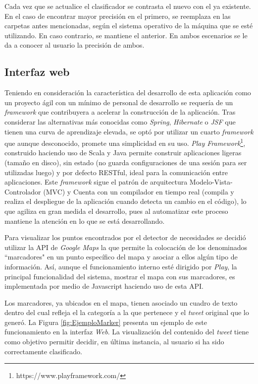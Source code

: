 Cada vez que se actualice el clasificador se contrasta el nuevo con el ya existente. En el caso de encontrar mayor precisión en el primero, se reemplaza en las carpetas antes mencionadas, según el sistema operativo de la máquina que se esté utilizando. En caso contrario, se mantiene el anterior. En ambos escenarios se le da a conocer al usuario la precisión de ambos.

\subsection{Interfaz web}
\label{sec:diseno:interfaz}

Teniendo en consideración la característica del desarrollo de esta aplicación como un proyecto ágil con un mínimo de personal de desarrollo se requería de un \textit{framework} que contribuyera a acelerar la construcción de la aplicación. Tras considerar las alternativas más conocidas como \textit{Spring}, \textit{Hibernate} o \textit{JSF} que tienen una curva de aprendizaje elevada, se optó por utilizar un cuarto \textit{framework} que aunque desconocido, promete una simplicidad en su uso. \textit{Play Framework}\footnote{https://www.playframework.com/}, construido haciendo uso de Scala y Java permite construir aplicaciones ligeras (tamaño en disco), sin estado (no guarda configuraciones de una sesión para ser utilizadas luego) y por defecto RESTful, ideal para la comunicación entre aplicaciones. Este \textit{framework} sigue el patrón de arquitectura Modelo-Vista-Controlador (MVC) y Cuenta con un compilador en tiempo real (compila y realiza el despliegue de la aplicación cuando detecta un cambio en el código), lo que agiliza en gran medida el desarrollo, pues al automatizar este proceso mantiene la atención en lo que se está desarrollando.

Para visualizar los puntos encontrados por el detector de necesidades se decidió utilizar la API de \textit{Google Maps} la que permite la colocación de los denominados ``marcadores" en un punto específico del mapa y asociar a ellos algún tipo de información. Así, aunque el funcionamiento interno esté dirigido por \textit{Play}, la principal funcionalidad del sistema, mostrar el mapa con sus marcadores, es implementada por medio de Javascript haciendo uso de esta API.

Los marcadores, ya ubicados en el mapa, tienen asociado un cuadro de texto dentro del cual refleja el la categoría a la que pertenece y el \textit{tweet} original que lo generó. La Figura \ref{fig:EjemploMarker} presenta un ejemplo de este funcionamiento en la interfaz \textit{Web}. La visualización del contenido del \textit{tweet} tiene como objetivo permitir decidir, en última instancia, al usuario si ha sido correctamente clasificado.

